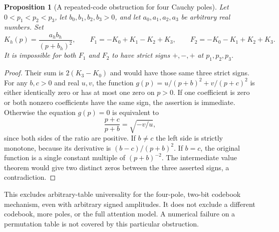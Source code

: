 \documentclass[11pt]{article}
\newtheorem{proposition}{Proposition}
\begin{document}
\begin{proposition}[A repeated-code obstruction for four Cauchy poles]
Let $0<p_1<p_2<p_3$, let $b_0,b_1,b_2,b_3>0$, and let
$a_0,a_1,a_2,a_3$ be arbitrary real numbers. Set
\[
 K_h(p)=\frac{a_hb_h}{(p+b_h)^2},\qquad
 F_1=-K_0+K_1-K_2+K_3,\qquad
 F_2=-K_0-K_1+K_2+K_3.
\]
It is impossible for both $F_1$ and $F_2$ to have strict signs
$+,-,+$ at $p_1,p_2,p_3$.
\end{proposition}
\begin{proof}
Their sum is $2(K_3-K_0)$ and would have those same three strict
signs. For any $b,c>0$ and real $u,v$, the function
$g(p)=u/(p+b)^2+v/(p+c)^2$ is either identically zero or has at most
one zero on $p>0$. If one coefficient is zero or both nonzero
coefficients have the same sign, the assertion is immediate. Otherwise
the equation $g(p)=0$ is equivalent to
\[
 \frac{p+c}{p+b}=\sqrt{-v/u},
\]
since both sides of the ratio are positive. If $b\ne c$ the left side
is strictly monotone, because its derivative is $(b-c)/(p+b)^2$.
If $b=c$, the original function is a single constant multiple of
$(p+b)^{-2}$. The intermediate value theorem would give two distinct
zeros between the three asserted signs, a contradiction.
\end{proof}

This excludes arbitrary-table universality for the four-pole,
two-bit codebook mechanism, even with arbitrary signed amplitudes.
It does not exclude a different codebook, more poles, or the full
attention model. A numerical failure on a permutation table is not
covered by this particular obstruction.
\end{document}
